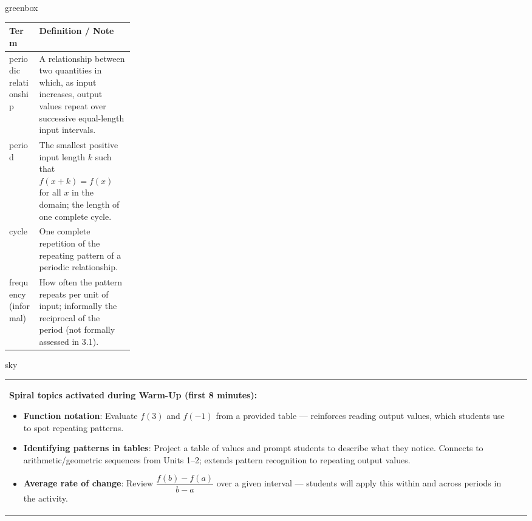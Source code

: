 \documentclass[10pt]{article}
\begin{document}
\begin{skillbox}{greenbox}
\begin{tabularx}{\linewidth}{@{} p{0.24\linewidth} X @{}}
\textbf{Term} & \textbf{Definition / Note} \\
\midrule
periodic relationship &
  A relationship between two quantities in which, as input increases,
  output values repeat over successive equal-length input intervals. \\[4pt]
period &
  The smallest positive input length $k$ such that $f(x+k)=f(x)$ for all
  $x$ in the domain; the length of one complete cycle. \\[4pt]
cycle &
  One complete repetition of the repeating pattern of a periodic relationship. \\[4pt]
frequency (informal) &
  How often the pattern repeats per unit of input; informally the reciprocal
  of the period (not formally assessed in 3.1). \\
\end{tabularx}
\end{skillbox}

\vspace{0.08in}

\begin{skillbox}{sky}
\begin{tabularx}{\linewidth}{@{}X c@{}}
\begin{minipage}[t]{0.96\linewidth}\vspace{0pt}
\textbf{Spiral topics activated during Warm-Up (first 8 minutes):}
\begin{itemize}[leftmargin=1.4em, itemsep=2pt]
  \item \textbf{Function notation}: Evaluate $f(3)$ and $f(-1)$ from a
    provided table --- reinforces reading output values, which students
    use to spot repeating patterns.
  \item \textbf{Identifying patterns in tables}: Project a table of values
    and prompt students to describe what they notice. Connects to
    arithmetic/geometric sequences from Units 1--2; extends pattern
    recognition to repeating output values.
  \item \textbf{Average rate of change}: Review
    $\dfrac{f(b)-f(a)}{b-a}$ over a given interval --- students will
    apply this within and across periods in the activity.
\end{itemize}
\end{minipage}
&
\end{tabularx}
\end{skillbox}
\end{document}
